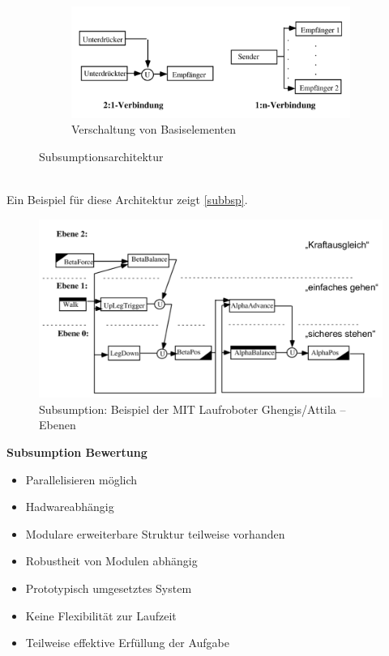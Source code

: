 \begin{figure}[h!]
\begin{subfigure}{.5\textwidth}
	\end{subfigure}
	\begin{subfigure}{.5\textwidth}
		\centering
		\includegraphics[width=\textwidth]{figures/verschaltung_basiselement.png}
		\caption{Verschaltung von Basiselementen}
	\end{subfigure}
	\caption{Subsumptionsarchitektur}
	\label{subsum}
\end{figure}\\
Ein Beispiel für diese Architektur zeigt \autoref{subbsp}.
\begin{figure}[h!]
	\includegraphics[width=.8\textwidth]{figures/subsumption_beispiel.png}
	\caption{Subsumption: Beispiel der MIT Laufroboter Ghengis/Attila -- Ebenen}
	\label{subbsp}
\end{figure}

\textbf{Subsumption Bewertung}
\begin{itemize}
	\item Parallelisieren möglich
	\item Hadwareabhängig
	\item Modulare erweiterbare Struktur teilweise vorhanden
	\item Robustheit von Modulen abhängig
	\item Prototypisch umgesetztes System
	\item Keine Flexibilität zur Laufzeit
	\item Teilweise effektive Erfüllung der Aufgabe
\end{itemize}

